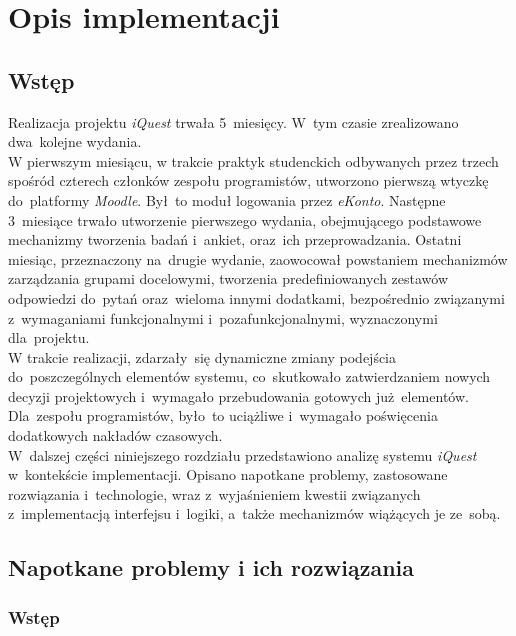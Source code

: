 \chapter{Opis implementacji}
\label{Chapter6}

\section{Wstęp}
\label{Chapter61}

Realizacja projektu \textit{iQuest} trwała 5~miesięcy. W~tym czasie zrealizowano dwa~kolejne wydania. \\

W pierwszym miesiącu, w trakcie praktyk studenckich odbywanych przez trzech spośród czterech członków zespołu programistów, utworzono pierwszą wtyczkę do~platformy \textit{Moodle}. Był~to moduł logowania przez \textit{eKonto}. Następne 3~miesiące trwało utworzenie pierwszego wydania, obejmującego podstawowe mechanizmy tworzenia badań i~ankiet, oraz~ich przeprowadzania. Ostatni miesiąc, przeznaczony na~drugie wydanie, zaowocował powstaniem mechanizmów zarządzania grupami docelowymi, tworzenia predefiniowanych zestawów odpowiedzi do~pytań oraz~wieloma innymi dodatkami, bezpośrednio związanymi z~wymaganiami funkcjonalnymi i~pozafunkcjonalnymi, wyznaczonymi dla~projektu. \\

W trakcie realizacji, zdarzały~się dynamiczne zmiany podejścia do~poszczególnych elementów systemu, co~skutkowało zatwierdzaniem nowych decyzji projektowych i~wymagało przebudowania gotowych już~elementów. Dla~zespołu programistów, było~to uciążliwe i~wymagało poświęcenia dodatkowych nakładów czasowych. \\

W~dalszej części niniejszego rozdziału przedstawiono analizę systemu \textit{iQuest} w~kontekście implementacji. Opisano napotkane problemy, zastosowane rozwiązania i~technologie, wraz z~wyjaśnieniem kwestii związanych z~implementacją interfejsu i~logiki, a~także mechanizmów wiążących je ze~sobą.

\section{Napotkane problemy i ich rozwiązania}
\label{Chapter62}

\subsection{Wstęp}
\label{Chapter621}

